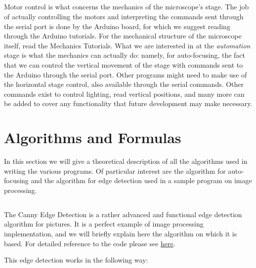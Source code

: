 \documentclass[a4paper]{article}
\begin{document}
	\subsection*{}
		
			Motor control is what concerns the mechanics of the microscope's stage.
			The job of actually controlling the motors and interpreting the commands sent through the serial port is done by the Arduino board, for which we suggest reading through the Arduino tutorials.
			For the mechanical structure of the microscope itself, read the Mechanics Tutorials.
			What we are interested in at the \emph{automation} stage is what the mechanics can actually do: namely, for auto-focusing, the fact that we can control the vertical movement of the stage with commands sent to the Arduino through the serial port.\newline{}
			Other programs might need to make use of the horizontal stage control, also available through the serial commands. Other commands exist to control lighting, read vertical positions, and many more can be added to cover any functionality that future development may make necessary.
	
	
	\section*{Algorithms and Formulas}
	
		In this section we will give a theoretical description of all the algorithms used in writing the various programs.
		Of particular interest are the algorithm for auto-focusing and the algorithm for edge detection used in a sample program on image processing.
	
	\subsection*{}
		
			The Canny Edge Detection is a rather advanced and functional edge detection algorithm for pictures.
			It is a perfect example of image processing implementation, and we will briefly explain here the algorithm on which it is based.
			For detailed reference to the code please see \href{https://github.com/OpenLabTools/Microscope/tree/master/Raspberry\%20Pi}{here}.
			
			This edge detection works in the following way:
		
\end{document}

